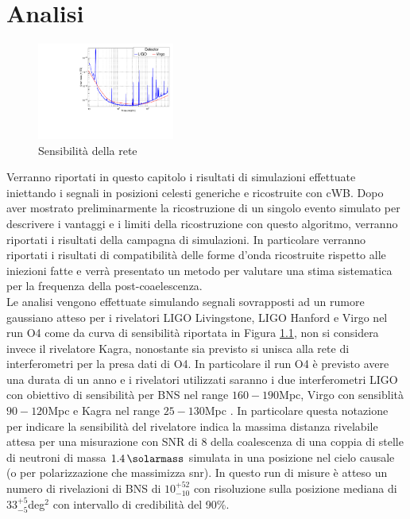 \chapter{Analisi}
\label{chapter:analisi}
\begin{figure}
	\vspace{-10pt}
	\begin{center}
		\includegraphics[width=0.4\textwidth]{figures/Capitolo_3/report/pds.pdf}
	\end{center}
	\vspace{-5pt}
	\caption{Sensibilità della rete}
	\label{fig:sensitivity_O4}
	\vspace{-10pt}
\end{figure}
Verranno riportati in questo capitolo i risultati di simulazioni effettuate iniettando i segnali in posizioni celesti generiche e ricostruite con cWB. Dopo aver mostrato preliminarmente la ricostruzione di un singolo evento simulato per descrivere i vantaggi e i limiti della ricostruzione con questo algoritmo, verranno riportati i risultati della campagna di simulazioni. In particolare verranno riportati i risultati di compatibilità delle forme d'onda ricostruite rispetto alle iniezioni fatte e verrà presentato un metodo per valutare una stima sistematica per la frequenza della post-coaelescenza.\\
Le analisi vengono effettuate simulando segnali sovrapposti ad un rumore gaussiano atteso per i rivelatori LIGO Livingstone, LIGO Hanford e Virgo nel run O4 come da curva di sensibilità riportata in Figura \ref{fig:sensitivity_O4}, non si considera invece il rivelatore Kagra, nonostante sia previsto si unisca alla rete di interferometri per la presa dati di O4. In particolare il run O4 è previsto avere una durata di un anno e i rivelatori utilizzati saranno i due interferometri LIGO con obiettivo di sensibilità per BNS nel range $160-190$Mpc, Virgo con sensiblità $90-120$Mpc e Kagra nel range $25-130$Mpc \cite{Abbott_2020a}. In particolare questa notazione per indicare la sensibilità del rivelatore indica la massima distanza rivelabile attesa per una misurazione con SNR di 8 della coalescenza di una coppia di stelle di neutroni di massa $\SI{1.4}{\solarmass}$ simulata in una posizione nel cielo causale (o per polarizzazione che massimizza snr). In questo run di misure è atteso un numero di rivelazioni di BNS di $10^{+52}_{-10}$ con risoluzione sulla posizione mediana di $33_{-5}^{+5}$deg$^2$ con intervallo di credibilità del 90\%\cite{Abbott_2020a}.\\
